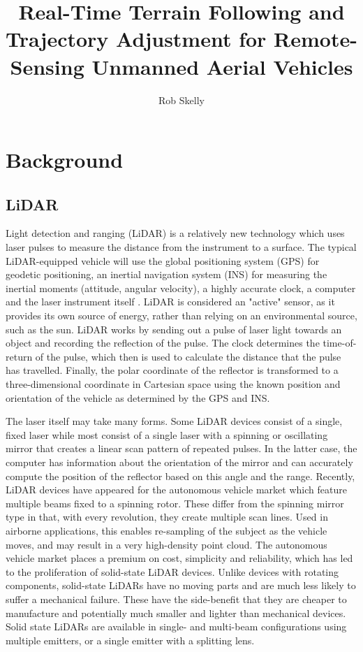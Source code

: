 \documentclass[10pt]{article}
\author{Rob Skelly}
\title{Real-Time Terrain Following and Trajectory Adjustment for Remote-Sensing Unmanned Aerial Vehicles}
\begin{document}
\maketitle

\doublespace


\section{Background}

\subsection{LiDAR}

Light detection and ranging (LiDAR) is a relatively new technology which uses laser pulses to measure the distance from the instrument to a surface. The typical LiDAR-equipped vehicle will use the global positioning system (GPS) for geodetic positioning, an inertial navigation system (INS) for measuring the inertial moments (attitude, angular velocity), a highly accurate clock, a computer and the laser instrument itself \cite{May2007,Lillesand1999}. LiDAR is considered an "active" sensor, as it provides its own source of energy, rather than relying on an environmental source, such as the sun. LiDAR works by sending out a pulse of laser light towards an object and recording the reflection of the pulse. The clock determines the time-of-return of the pulse, which then is used to calculate the distance that the pulse has travelled. Finally, the polar coordinate of the reflector is transformed to a three-dimensional coordinate in Cartesian space using the known position and orientation of the vehicle as determined by the GPS and INS. 

The laser itself may take many forms. Some LiDAR devices consist of a single, fixed laser while most consist of a single laser with a spinning or oscillating mirror that creates a linear scan pattern of repeated pulses. In the latter case, the computer has information about the orientation of the mirror and can accurately compute the position of the reflector based on this angle and the range. Recently, LiDAR devices have appeared for the autonomous vehicle market which feature multiple beams fixed to a spinning rotor. These differ from the spinning mirror type in that, with every revolution, they create multiple scan lines. Used in airborne applications, this enables re-sampling of the subject as the vehicle moves, and may result in a very high-density point cloud. The autonomous vehicle market places a premium on cost, simplicity and reliability, which has led to the proliferation of solid-state LiDAR devices. Unlike devices with rotating components, solid-state LiDARs have no moving parts and are much less likely to suffer a mechanical failure. These have the side-benefit that they are cheaper to manufacture and potentially much smaller and lighter than mechanical devices. Solid state LiDARs are available in single- and multi-beam configurations using multiple emitters, or a single emitter with a splitting lens.
\end{document}
